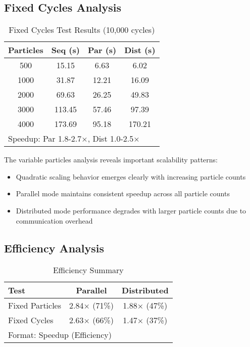 \documentclass[sigconf]{acmart}
\begin{document}
\subsection{Fixed Cycles Analysis}

\begin{table}[h]
\centering
\caption{Fixed Cycles Test Results (10,000 cycles)}
\label{tab:fixed_cycles}
\footnotesize
\begin{tabular}{@{}cccc@{}}
\toprule
Particles & Seq (s) & Par (s) & Dist (s) \\
\midrule
500 & 15.15 & 6.63 & 6.02 \\
1000 & 31.87 & 12.21 & 16.09 \\
2000 & 69.63 & 26.25 & 49.83 \\
3000 & 113.45 & 57.46 & 97.39 \\
4000 & 173.69 & 95.18 & 170.21 \\
\bottomrule
\multicolumn{4}{l}{\scriptsize Speedup: Par 1.8-2.7×, Dist 1.0-2.5×}
\end{tabular}
\end{table}

The variable particles analysis reveals important scalability patterns:
\begin{itemize}
    \item Quadratic scaling behavior emerges clearly with increasing particle counts
    \item Parallel mode maintains consistent speedup across all particle counts
    \item Distributed mode performance degrades with larger particle counts due to communication overhead
\end{itemize}

\subsection{Efficiency Analysis}

\begin{table}[h]
\centering
\caption{Efficiency Summary}
\label{tab:efficiency}
\footnotesize
\begin{tabular}{@{}lcc@{}}
\toprule
Test & Parallel & Distributed \\
\midrule
Fixed Particles & 2.84× (71\%) & 1.88× (47\%) \\
Fixed Cycles & 2.63× (66\%) & 1.47× (37\%) \\
\bottomrule
\multicolumn{3}{l}{\scriptsize Format: Speedup (Efficiency)}
\end{tabular}
\end{table}
\end{document}
